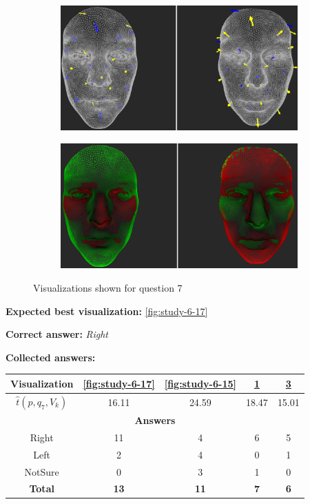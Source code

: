 \begin{figure}[h]
\begin{subfigure}{0.49\textwidth}
\includegraphics[width=\textwidth]{./img-study/pair18.PNG}
\caption{}
\label{fig:study-6-18}
\end{subfigure}
\begin{subfigure}{0.49\textwidth}
\includegraphics[width=\textwidth]{./img-study/pair16.PNG}
\caption{}
\label{fig:study-6-16}
\end{subfigure}
\caption{Visualizations shown for question 7}
\end{figure}
\medskip

{\bf Expected best visualization:} \ref{fig:study-6-17}
\medskip

{\bf Correct answer:} {\it Right}
\medskip

{\bf Collected answers:}

\begin{center}
\begin{tabular}{| c | c | c | c | c |}
	\hline
	Visualization & \ref{fig:study-6-17} & \ref{fig:study-6-15} & \ref{fig:study-6-18} & \ref{fig:study-6-16}\\ \hline
	\(\widehat{t}(p, q_7, V_k)\) & 16.11 & 24.59 & 18.47 & 15.01\\ \hline
	\multicolumn{5}{|c|}{\bf Answers} \\ \hline
	\rowcolor{yellow!30} Right & 11 & 4 & 6 & 5\\ \hline
	Left & 2 & 4 & 0 & 1\\ \hline
	NotSure & 0 & 3 & 1 & 0\\ \hline
	{\bf Total} & {\bf 13} & {\bf 11} & {\bf 7} & {\bf 6}\\ \hline
\end{tabular}
\end{center}
\clearpage

